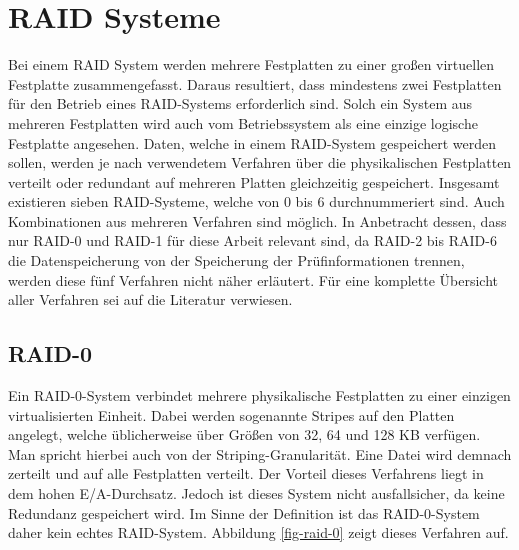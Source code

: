 \section{RAID Systeme}
Bei einem \ac{RAID} System werden mehrere Festplatten zu einer großen virtuellen Festplatte zusammengefasst\cite[vgl.][Seite 279 f.]{mandl13}.
Daraus resultiert, dass mindestens zwei Festplatten für den Betrieb eines \ac{RAID}-Systems erforderlich sind.
Solch ein System aus mehreren Festplatten wird auch vom Betriebssystem als eine einzige logische Festplatte angesehen\cite[vgl.][Seite 279 f.]{mandl13}.
Daten, welche in einem \ac{RAID}-System gespeichert werden sollen, werden je nach verwendetem Verfahren über die physikalischen Festplatten verteilt oder redundant auf mehreren Platten gleichzeitig gespeichert\cite[vgl.][Seite 279 f.]{mandl13}.
Insgesamt existieren sieben \ac{RAID}-Systeme, welche von 0 bis 6 durchnummeriert sind\cite[vgl.][Seite 428 ff.]{hert03}.
Auch Kombinationen aus mehreren Verfahren sind möglich.
In Anbetracht dessen, dass nur \ac{RAID}-0 und \ac{RAID}-1 für diese Arbeit relevant sind, da \ac{RAID}-2 bis \ac{RAID}-6 die Datenspeicherung von der Speicherung der Prüfinformationen trennen, werden diese fünf Verfahren nicht näher erläutert\cite[vgl.][Seite 430 ff.]{hert03}.
Für eine komplette Übersicht aller Verfahren sei auf die Literatur \cite{mandl13} verwiesen.

\subsection{RAID-0}
Ein \ac{RAID}-0-System verbindet mehrere physikalische Festplatten zu einer einzigen virtualisierten Einheit.
Dabei werden sogenannte Stripes auf den Platten angelegt, welche üblicherweise über Größen von 32, 64 und 128 \ac{KB} verfügen.
Man spricht hierbei auch von der Striping-Granularität\cite[vgl.][Seite 281 f.]{mandl13}.
Eine Datei wird demnach zerteilt und auf alle Festplatten verteilt.
Der Vorteil dieses Verfahrens liegt in dem hohen \ac{E/A}-Durchsatz\cite[vgl.][Seite 281 f.]{mandl13}.
Jedoch ist dieses System nicht ausfallsicher, da keine Redundanz gespeichert wird.
Im Sinne der Definition ist das \ac{RAID}-0-System daher kein echtes \ac{RAID}-System\cite[vgl.][Seite 281 f.]{mandl13}.
Abbildung \ref{fig-raid-0} zeigt dieses Verfahren auf.

